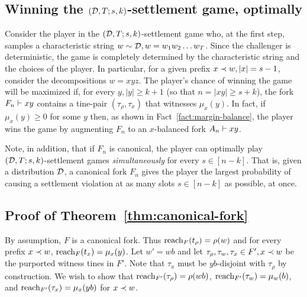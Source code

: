 \subsection{Winning the \texorpdfstring{$(\mathcal{D},T;s,k)$-}{}settlement game, optimally}\label{sec:adv-winning-settlement-game} 
	Consider the player in the $(\mathcal{D},T;s,k)$-settlement game 
	who, at the first step, samples 
	a characteristic string $w \sim \mathcal{D}, w = w_1 w_2 \ldots w_T$. 
	Since the challenger is deterministic, 
	the game is completely determined by the characteristic string 
	and the choices of the player. 
	In particular, for a given prefix $x \prec w, |x| = s - 1$, 
	consider the decompositions $w = xyz$. 
	The player's chance of winning the game will be maximized if, 
	for every $y, |y| \geq k + 1$ (so that $n = |xy|\geq s + k$),
	the fork $F_n \vdash xy$ 
	contains a tine-pair $(\tau_\rho, \tau_x)$ that witnesses $\mu_x(y)$. 
	In fact, 
	if $\mu_x(y) \geq 0$ for some $y$ then, 
	as shown in Fact~\ref{fact:margin-balance}, 
	the player wins the game by
	augmenting $F_n$ to an $x$-balanced fork $A_n \vdash xy$. 

	Note, in addition, that if $F_n$ is canonical, 
	the player can optimally play $(\mathcal{D}, T; s, k)$-settlement games 
	\emph{simultaneously} for every $s \in [n - k]$. 
	That is, given a distribution $\mathcal{D}$, 
	a canonical fork $F_n$ gives the player 
	the largest probability 
	of causing a settlement violation at as many slots $s \in [n - k]$ as possible, 
	at once.

\subsection{Proof of Theorem~\ref{thm:canonical-fork}}
	By assumption, $F$ is a canonical fork. 
	Thus $\operatorname{reach}_F(t_\rho) = \rho(w)$ 
	and 
	for every prefix $x \prec w$, 
	$\operatorname{reach}_F(t_x) = \mu_x(y)$. 
	Let $w' = wb$ and let $\tau_\rho, \tau_w, 
	\tau_x \in F^\prime, x \prec w$ 
	be the purported witness tines in $F'$. 
	Note that $\tau_x$ must be 
	$yb$-disjoint with $\tau_\rho$ by construction. 
	We wish to show that 
	$\operatorname{reach}_{F^\prime}(\tau_\rho) = \rho(w b)$, 
	$\operatorname{reach}_{F^\prime}(\tau_w) = \mu_{w}(b)$,  
	and 
	$\operatorname{reach}_{F^\prime}(\tau_x) = \mu_x(y b)$ for $x \prec w$.	

